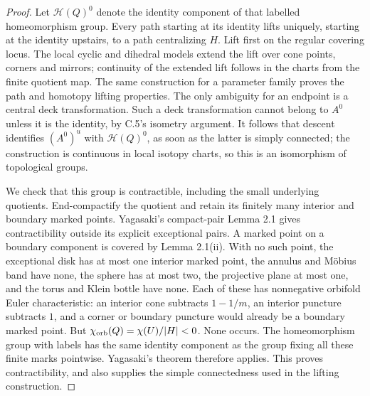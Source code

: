 \begin{proof}
Let $\mathcal H(Q)^0$ denote the identity component of that labelled
homeomorphism group. Every path starting at its identity lifts uniquely,
starting at the identity upstairs, to a path centralizing $H$. Lift
first on the regular covering locus. The local cyclic and dihedral
models extend the lift over cone points, corners and mirrors; continuity
of the extended lift follows in the charts from the finite quotient
map. The same construction for a parameter family proves the path and
homotopy lifting properties. The only ambiguity for an endpoint is a
central deck transformation. Such a deck transformation cannot belong
to $A^0$ unless it is the identity, by C.5's isometry argument. It follows
that descent identifies $(A^0)^u$ with $\mathcal H(Q)^0$, as soon as the
latter is simply connected; the construction is continuous in local
isotopy charts, so this is an isomorphism of topological groups.

We check that this group is contractible, including the small underlying
quotients. End-compactify the quotient and retain its finitely many
interior and boundary marked points. Yagasaki's compact-pair Lemma 2.1
\cite{C_Yagasaki2000} gives contractibility outside its explicit
exceptional pairs. A marked point on a boundary component is covered
by Lemma 2.1(ii). With no such point, the exceptional disk has at most
one interior marked point, the annulus and M\"obius band have none, the
sphere has at most two, the projective plane at most one, and the torus
and Klein bottle have none. Each of these has nonnegative orbifold
Euler characteristic: an interior cone subtracts $1-1/m$, an interior
puncture subtracts $1$, and a corner or boundary puncture would already
be a boundary marked point. But
$\chi_{\rm orb}(Q)=\chi(U)/|H|<0$. None occurs. The homeomorphism group
with labels has the same identity component as the group fixing all
these finite marks pointwise. Yagasaki's theorem therefore applies.
This proves contractibility, and also supplies the simple connectedness
used in the lifting construction.
\end{proof}

